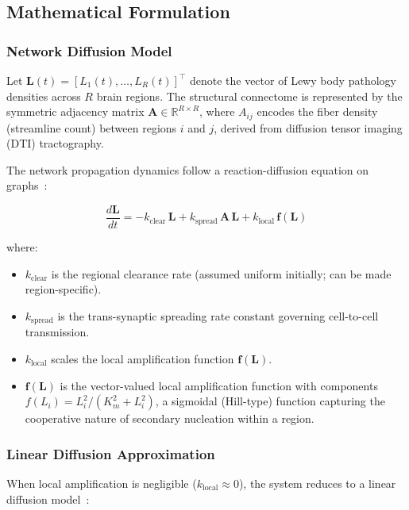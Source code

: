 \subsection{Mathematical Formulation}

\subsubsection{Network Diffusion Model}

Let $\mathbf{L}(t) = [L_1(t), \ldots, L_R(t)]^\top$ denote the vector of Lewy body pathology densities across $R$ brain regions. The structural connectome is represented by the symmetric adjacency matrix $\mathbf{A} \in \mathbb{R}^{R \times R}$, where $A_{ij}$ encodes the fiber density (streamline count) between regions $i$ and $j$, derived from diffusion tensor imaging (DTI) tractography.

The network propagation dynamics follow a reaction-diffusion equation on graphs~\cite{raj2012,fornari2019}:

\begin{equation}
\frac{d\mathbf{L}}{dt} = -k_\text{clear} \, \mathbf{L} + k_\text{spread} \, \mathbf{A} \, \mathbf{L} + k_\text{local} \, \mathbf{f}(\mathbf{L})
\label{eq:propagation}
\end{equation}

where:
\begin{itemize}
\item $k_\text{clear}$ is the regional clearance rate (assumed uniform initially; can be made region-specific).
\item $k_\text{spread}$ is the trans-synaptic spreading rate constant governing cell-to-cell transmission.
\item $k_\text{local}$ scales the local amplification function $\mathbf{f}(\mathbf{L})$.
\item $\mathbf{f}(\mathbf{L})$ is the vector-valued local amplification function with components $f(L_i) = L_i^2 / (K_m^2 + L_i^2)$, a sigmoidal (Hill-type) function capturing the cooperative nature of secondary nucleation within a region.
\end{itemize}

\subsubsection{Linear Diffusion Approximation}

When local amplification is negligible ($k_\text{local} \approx 0$), the system reduces to a linear diffusion model~\cite{raj2012}:

